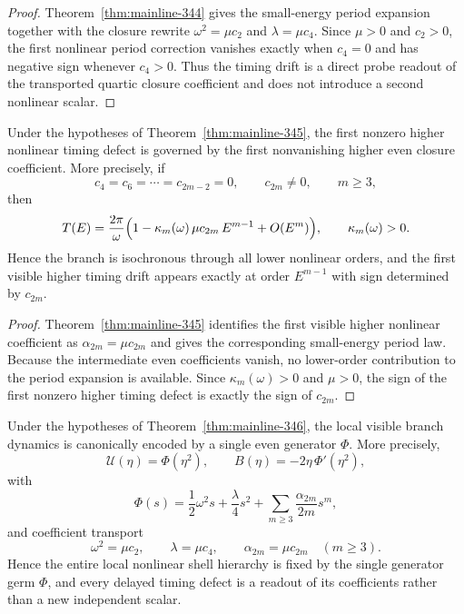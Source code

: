 \begin{proof}
Theorem~\ref{thm:mainline-344} gives the small-energy period expansion together with the closure rewrite $\omega^2=\mu c_2$ and $\lambda=\mu c_4$. Since $\mu>0$ and $c_2>0$, the first nonlinear period correction vanishes exactly when $c_4=0$ and has negative sign whenever $c_4>0$. Thus the timing drift is a direct probe readout of the transported quartic closure coefficient and does not introduce a second nonlinear scalar.
\end{proof}


\begin{proposition}
\label{prop:app-c-34-6}
Under the hypotheses of Theorem~\ref{thm:mainline-345}, the first nonzero higher nonlinear timing defect is governed by the first nonvanishing higher even closure coefficient. More precisely, if
\[
  c_4=c_6=\cdots=c_{2m-2}=0,
  \qquad c_{2m}\neq 0,
  \qquad m\ge 3,
\]
then
\[
  T(E)=\frac{2\pi}{\omega}\Bigl(1-\kappa_m(\omega)\,\mu c_{2m}\,E^{m-1}+O(E^m)\Bigr),
  \qquad \kappa_m(\omega)>0.
\]
Hence the branch is isochronous through all lower nonlinear orders, and the first visible higher timing drift appears exactly at order $E^{m-1}$ with sign determined by $c_{2m}$.
\end{proposition}

\begin{proof}
Theorem~\ref{thm:mainline-345} identifies the first visible higher nonlinear coefficient as $\alpha_{2m}=\mu c_{2m}$ and gives the corresponding small-energy period law. Because the intermediate even coefficients vanish, no lower-order contribution to the period expansion is available. Since $\kappa_m(\omega)>0$ and $\mu>0$, the sign of the first nonzero higher timing defect is exactly the sign of $c_{2m}$.
\end{proof}


\begin{proposition}
\label{prop:app-c-34-7}
Under the hypotheses of Theorem~\ref{thm:mainline-346}, the local visible branch dynamics is canonically encoded by a single even generator $\Phi$. More precisely,
\[
  \mathcal U(\eta)=\Phi(\eta^2),
  \qquad
  B(\eta)=-2\eta\,\Phi'(\eta^2),
\]
with
\[
  \Phi(s)=\frac12\omega^2 s + \frac{\lambda}{4}s^2 + \sum_{m\ge 3}\frac{\alpha_{2m}}{2m}s^m,
\]
and coefficient transport
\[
  \omega^2=\mu c_2,
  \qquad
  \lambda=\mu c_4,
  \qquad
  \alpha_{2m}=\mu c_{2m}\quad (m\ge 3).
\]
Hence the entire local nonlinear shell hierarchy is fixed by the single generator germ $\Phi$, and every delayed timing defect is a readout of its coefficients rather than a new independent scalar.
\end{proposition}

